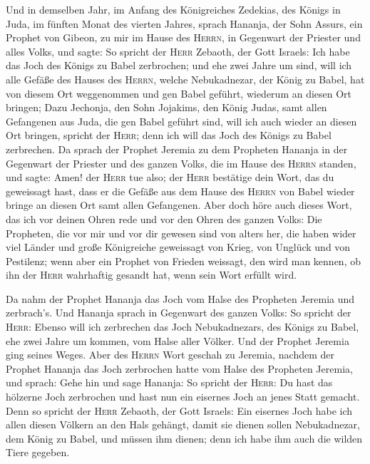  Und in demselben Jahr, im Anfang des Königreiches
Zedekias, des Königs in Juda, im fünften Monat des vierten Jahres,
sprach Hananja, der Sohn Assurs, ein Prophet von Gibeon, zu mir im Hause
des \textsc{Herrn}, in Gegenwart der Priester und alles Volks, und
sagte:  So spricht der \textsc{Herr} Zebaoth, der Gott
Israels: Ich habe das Joch des Königs zu Babel zerbrochen;
 und ehe zwei Jahre um sind, will ich alle Gefäße des
Hauses des \textsc{Herrn}, welche Nebukadnezar, der König zu Babel, hat
von diesem Ort weggenommen und gen Babel geführt, wiederum an diesen Ort
bringen;  Dazu Jechonja, den Sohn Jojakims, den König
Judas, samt allen Gefangenen aus Juda, die gen Babel geführt sind, will
ich auch wieder an diesen Ort bringen, spricht der \textsc{Herr}; denn
ich will das Joch des Königs zu Babel zerbrechen.  Da
sprach der Prophet Jeremia zu dem Propheten Hananja in der Gegenwart der
Priester und des ganzen Volks, die im Hause des \textsc{Herrn} standen,
 und sagte: Amen! der \textsc{Herr} tue also; der
\textsc{Herr} bestätige dein Wort, das du geweissagt hast, dass er die
Gefäße aus dem Hause des \textsc{Herrn} von Babel wieder bringe an
diesen Ort samt allen Gefangenen.  Aber doch höre auch
dieses Wort, das ich vor deinen Ohren rede und vor den Ohren des ganzen
Volks:  Die Propheten, die vor mir und vor dir gewesen
sind von alters her, die haben wider viel Länder und große Königreiche
geweissagt von Krieg, von Unglück und von Pestilenz;  wenn
aber ein Prophet von Frieden weissagt, den wird man kennen, ob ihn der
\textsc{Herr} wahrhaftig gesandt hat, wenn sein Wort erfüllt wird.

 Da nahm der Prophet Hananja das Joch vom Halse des
Propheten Jeremia und zerbrach's.  Und Hananja sprach in
Gegenwart des ganzen Volks: So spricht der \textsc{Herr}: Ebenso will
ich zerbrechen das Joch Nebukadnezars, des Königs zu Babel, ehe zwei
Jahre um kommen, vom Halse aller Völker. Und der Prophet Jeremia ging
seines Weges.  Aber des \textsc{Herrn} Wort geschah zu
Jeremia, nachdem der Prophet Hananja das Joch zerbrochen hatte vom Halse
des Propheten Jeremia, und sprach:  Gehe hin und sage
Hananja: So spricht der \textsc{Herr}: Du hast das hölzerne Joch
zerbrochen und hast nun ein eisernes Joch an jenes Statt gemacht.
 Denn so spricht der \textsc{Herr} Zebaoth, der Gott
Israels: Ein eisernes Joch habe ich allen diesen Völkern an den Hals
gehängt, damit sie dienen sollen Nebukadnezar, dem König zu Babel, und
müssen ihm dienen; denn ich habe ihm auch die wilden Tiere gegeben.

